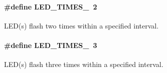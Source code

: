 \paragraph[{\texorpdfstring{L\+E\+D\+\_\+\+T\+I\+M\+E\+S\+\_\+2}{LED_TIMES_2}}]{\setlength{\rightskip}{0pt plus 5cm}\#define L\+E\+D\+\_\+\+T\+I\+M\+E\+S\+\_~2}\hypertarget{group___l_e_d___l_i_g_h_t_i_n_g___t_i_m_e_s_ga8e63cf904892c46960392411038fec8d}{}\label{group___l_e_d___l_i_g_h_t_i_n_g___t_i_m_e_s_ga8e63cf904892c46960392411038fec8d}
L\+E\+D(s) flash two times within a specified interval. 
\paragraph[{\texorpdfstring{L\+E\+D\+\_\+\+T\+I\+M\+E\+S\+\_\+3}{LED_TIMES_3}}]{\setlength{\rightskip}{0pt plus 5cm}\#define L\+E\+D\+\_\+\+T\+I\+M\+E\+S\+\_~3}\hypertarget{group___l_e_d___l_i_g_h_t_i_n_g___t_i_m_e_s_gaf2aa0de625adbb45e597afe0131fd356}{}\label{group___l_e_d___l_i_g_h_t_i_n_g___t_i_m_e_s_gaf2aa0de625adbb45e597afe0131fd356}
L\+E\+D(s) flash three times within a specified interval. 